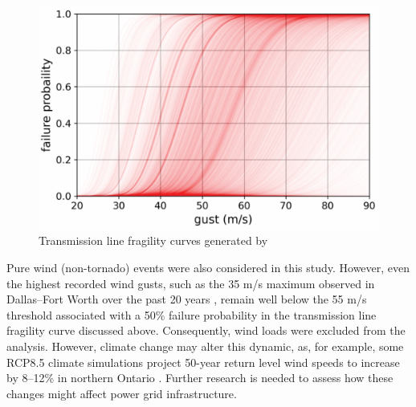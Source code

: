 \documentclass[12pt]{article}
\begin{document}
\begin{figure}[ht]
    \centering %
    \includegraphics[width=\textwidth]{TLfragility.pdf}
    \caption[Transmission line fragility curves]{Transmission line fragility curves generated by \cite{Watson2024}}
    \label{fig:TLfragility}
\end{figure}
Pure wind (non-tornado) events were also considered in this study. However, even the highest recorded wind gusts, such as the 35 m/s maximum observed in Dallas–Fort Worth over the past 20 years \cite{NWS}, remain well below the 55 m/s threshold associated with a 50\% failure probability in the transmission line fragility curve discussed above. Consequently, wind loads were excluded from the analysis. However, climate change may alter this dynamic, as, for example, some RCP8.5 climate simulations project 50-year return level wind speeds to increase by 8–12\% in northern Ontario \cite{jeong2019projected}. Further research is needed to assess how these changes might affect power grid infrastructure. \par
\end{document}
